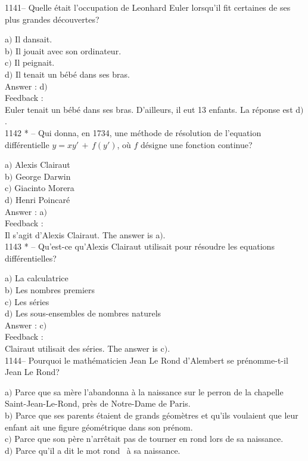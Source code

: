 ﻿\documentclass[letterpaper, 12pt]{article}
\begin{document}
1141-- Quelle \'etait l'occupation de Leonhard Euler lorsqu'il fit
certaines de ses plus grandes d\'ecouvertes?

a$)$ Il dansait. \\
b$)$ Il jouait avec son ordinateur.  \\
c$)$ Il peignait.   \\
d$)$ Il tenait un b\'eb\'e dans ses bras.  \\

Answer : d$)$\\

Feedback : \\
Euler tenait un b\'eb\'e dans ses bras. D'ailleurs, il eut 13 enfants. La
r\'eponse est d$)$. \\

1142 * -- Qui donna, en 1734, une m\'ethode de r\'esolution de
l'equation diff\'erentielle $y=xy'\,+\,f(y')$, o\`u $f$ d\'esigne
une fonction continue?

a$)$ Alexis Clairaut \\
b$)$ George Darwin   \\
c$)$ Giacinto Morera  \\
d$)$ Henri Poincar\'e \\

Answer : a$)$\\

Feedback : \\
Il s'agit d'Alexis Clairaut. The answer is a$)$. \\

1143 * -- Qu'est-ce qu'Alexis Clairaut utilisait pour r\'esoudre les
equations diff\'erentielles?

a$)$ La calculatrice \\
b$)$ Les nombres premiers \\
c$)$ Les s\'eries \\
d$)$ Les sous-ensembles de nombres naturels  \\

Answer : c$)$\\

Feedback : \\
Clairaut utilisait des s\'eries. The answer is c$)$. \\

1144-- Pourquoi le math\'ematicien Jean Le Rond d'Alembert se
pr\'enomme-t-il Jean Le Rond?

a$)$ Parce que sa m\`ere l'abandonna \`a la naissance sur le perron de la
chapelle Saint-Jean-Le-Rond, pr\`es de
Notre-Dame de Paris. \\
b$)$ Parce que ses parents \'etaient de grands g\'eom\`etres et qu'ils
voulaient que leur enfant ait une figure
g\'eom\'etrique dans son pr\'enom. \\
c$)$ Parce que son p\`ere n'arr\^etait pas de tourner en rond lors de sa
naissance.  \\
d$)$ Parce qu'il a dit le mot \og rond \fg\ \`a sa naissance.  \\
\end{document}
